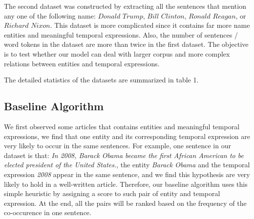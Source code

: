 \documentclass[12pt,a4paper]{article}
\begin{document}
The second dataset was constructed by extracting all the sentences that mention any one of the following name: $Donald$ $Trump$, $Bill$ $Clinton$, $Ronald$ $Reagan$, or $Richard$ $Nixon$. This dataset is more complicated since it contains far more name entities and meaningful temporal expressions. Also, the number of sentences / word tokens in the dataset are more than twice in the first dataset. The objective is to test whether our model can deal with larger corpus and more complex relations between entities and temporal expressions. 

The detailed statistics of the datasets are summarized in table 1.

\begin{table}[h]
\caption{Statistics of the datasets}
\end{table}

\subsection{Baseline Algorithm}
We first observed some articles that contains entities and meaningful temporal expressions, we find that one entity and its corresponding temporal expression are very likely to occur in the same sentences. For example, one sentence in our dataset is that: \textit{In 2008, Barack Obama became the first African American to be elected president of the United States.}, the entity \textit{Barack Obama} and the temporal expression \textit{2008} appear in the same sentence, and we find this hypothesis are very likely to hold in a well-written article. Therefore, our baseline algorithm uses this simple heuristic by assigning a score to such pair of entity and temporal expression. At the end, all the pairs will be ranked based on the frequency of the co-occurence in one sentence. 
\end{document}
